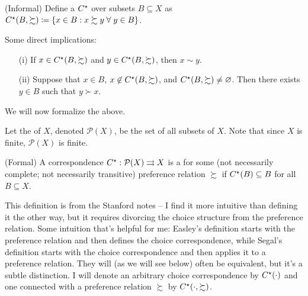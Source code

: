 \documentclass[12pt]{article}
\begin{document}
\begin{definition}
	(Informal) Define a  $C^\star$ over subsets $B \subseteq X$ as $C\opt(B,\succsim) \coloneqq \{x \in B : x \succsim y \forall y \in B\}$.
\end{definition}
\begin{remark}
	Some direct implications:
	\begin{itemize}
		\item[(i)] If $x \in C^\star(B,\succsim)$ and $y \in C^\star(B,\succsim)$, then $x \sim y$.
		
		\item[(ii)] Suppose that $x \in B$, $x \not\in C^\star(B,\succsim)$, and $C^\star(B,\succsim) \ne \mathop{\varnothing}$. Then there exists $y \in B$ such that $y \succ x$. 
	\end{itemize}
\end{remark}

We will now formalize the above.

\begin{definition}
	Let the  of $X$, denoted $\mathcal{P}(X)$, be the set of all subsets of $X$. Note that since $X$ is finite, $\mathcal{P}(X)$ is finite.
\end{definition}

\begin{definition}
	(Formal) A correspondence $C^\star : \mathcal{P}(X) \rightrightarrows X$ is a  for some (not necessarily complete; not necessarily transitive) preference relation $\succsim$ if $C^\star(B) \subseteq B$ for all $B \subseteq X$.
\end{definition}
\begin{remark}
	This definition is from the Stanford notes -- I find it more intuitive than defining it the other way, but it requires divorcing the choice structure from the preference relation. Some intuition that's helpful for me: Easley's definition starts with the preference relation and then defines the choice correspondence, while Segal's definition starts with the choice correspondence and then applies it to a preference relation. They will (as we will see below) often be equivalent, but it's a subtle distinction. I will denote an arbitrary choice correspondence by $C^\star(\cdot)$ and one connected with a preference relation $\succsim$ by $C^\star(\cdot, \succsim)$.
\end{remark}
\end{document}
